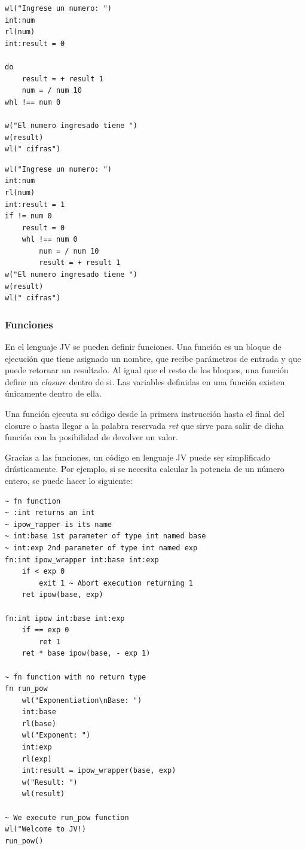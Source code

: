 \documentclass[spanish]{article}
\begin{document}
                \begin{lstlisting}
wl("Ingrese un numero: ")
int:num
rl(num)
int:result = 0

do
    result = + result 1
    num = / num 10
whl !== num 0

w("El numero ingresado tiene ")
w(result)
wl(" cifras")
                \end{lstlisting}
                \begin{lstlisting}
wl("Ingrese un numero: ")
int:num
rl(num)
int:result = 1
if != num 0
    result = 0
    whl !== num 0
        num = / num 10
        result = + result 1
w("El numero ingresado tiene ")
w(result)
wl(" cifras")
                \end{lstlisting}

            \subsubsection{Funciones}
                \par En el lenguaje JV se pueden definir funciones. Una función es un bloque de ejecución que tiene asignado un nombre, que recibe parámetros de entrada y que puede retornar un resultado. Al igual que el resto de los bloques, una función define un \textit{closure} dentro de si. Las variables definidas en una función existen únicamente dentro de ella.
                \par Una función ejecuta su código desde la primera instrucción hasta el final del closure o hasta llegar a la palabra reservada \textit{ret} que sirve para salir de dicha función con la posibilidad de devolver un valor.
                \par Gracias a las funciones, un código en lenguaje JV puede ser simplificado drásticamente. Por ejemplo, si se necesita calcular la potencia de un número entero, se puede hacer lo siguiente:
                \begin{lstlisting}
~ fn function
~ :int returns an int
~ ipow_rapper is its name
~ int:base 1st parameter of type int named base
~ int:exp 2nd parameter of type int named exp
fn:int ipow_wrapper int:base int:exp
	if < exp 0
		exit 1 ~ Abort execution returning 1
	ret ipow(base, exp)

fn:int ipow int:base int:exp
	if == exp 0
		ret 1
	ret * base ipow(base, - exp 1)

~ fn function with no return type
fn run_pow
    wl("Exponentiation\nBase: ")
    int:base
    rl(base)
    wl("Exponent: ")
    int:exp
    rl(exp)
    int:result = ipow_wrapper(base, exp)
    w("Result: ")
    wl(result)

~ We execute run_pow function
wl("Welcome to JV!)
run_pow()
                \end{lstlisting}
\end{document}
